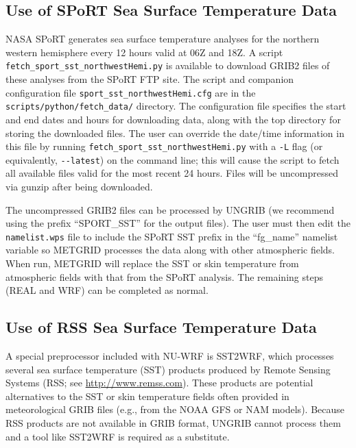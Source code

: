 \subsection{Use of SPoRT Sea Surface Temperature Data}
\label{subsec:SportSST}

NASA SPoRT generates sea surface temperature analyses for the northern 
western hemisphere every 12 hours valid at 06Z and 18Z.  A script\\
\texttt{fetch\_sport\_sst\_northwestHemi.py} is available to download
GRIB2 files of these analyses from the SPoRT FTP site.  The script and
companion configuration file \texttt{sport\_sst\_northwestHemi.cfg} are in the 
\texttt{scripts/python/fetch\_data/} directory.  The configuration file specifies the
start and end dates and hours for downloading data, along with the top 
directory for storing the downloaded files.  The user can override the 
date/time information in this file by running 
\texttt{fetch\_sport\_sst\_northwestHemi.py} with a \texttt{-L} flag (or 
equivalently, \texttt{-{}-latest}) on the command line; this will cause the 
script to fetch all available files valid for the most recent 24 hours.  Files
will be uncompressed via gunzip after being downloaded.

The uncompressed GRIB2 files can be processed by UNGRIB (we recommend using 
the prefix ``SPORT\_SST'' for the output files).  The user must then edit the 
\texttt{namelist.wps} file to include the SPoRT SST prefix in the 
``fg\_name'' namelist variable so METGRID processes the data along with other 
atmospheric fields. When run, METGRID will replace the SST or skin temperature
from atmospheric fields with that from the SPoRT analysis.  The remaining 
steps (REAL and WRF) can be completed as normal.
 
\subsection{Use of RSS Sea Surface Temperature Data}
\label{subsec:RSSSST}

A special preprocessor included with NU-WRF is SST2WRF, which processes
several sea surface temperature (SST) products produced by Remote Sensing
Systems (RSS; see \url{http://www.remss.com}). These products are potential 
alternatives to the SST or skin temperature fields often provided in 
meteorological GRIB files (e.g., from the NOAA GFS or NAM models). Because 
RSS products are not available in GRIB format, UNGRIB cannot process them
and a tool like SST2WRF is required as a substitute.

